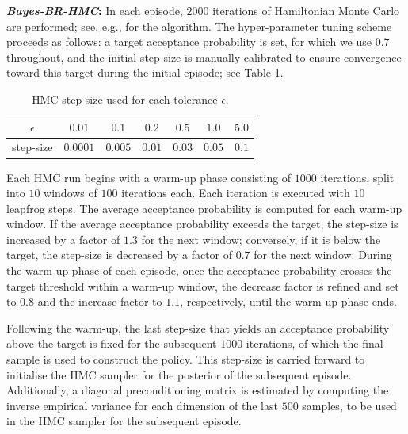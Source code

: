 \documentclass{amsart}
\begin{document}
\textbf{\textit{Bayes-BR-HMC}:} 
In each episode, $2000$ iterations of Hamiltonian Monte Carlo are performed; see, e.g., \citet{hmcneal} for the algorithm. The hyper-parameter tuning scheme proceeds as follows: a target acceptance probability is set, for which we use $0.7$ throughout, and the initial step-size is manually calibrated to ensure convergence toward this target during the initial episode; see Table \ref{tab:hmc_stepsize}.

\begin{table}[h]
    \centering
    \caption{HMC step-size used for each tolerance $\epsilon$.}
    \label{tab:hmc_stepsize}
    \begin{tabular}{|c|c|c|c|c|c|c|}
        \hline
         $\epsilon$ &  $0.01$ & $0.1$ & $0.2$ & $0.5$ & $1.0$ & $5.0$\\
        \hline
        step-size & $0.0001$ & $0.005$ & $0.01$ & $0.03$ & $0.05$ & $0.1$   \\
        \hline
    \end{tabular}
\end{table}


Each HMC run begins with a warm-up phase consisting of $1000$ iterations, split into $10$ windows of $100$ iterations each. Each iteration is executed with $10$ leapfrog steps. The average acceptance probability is computed for each warm-up window. If the average acceptance probability exceeds the target, the step-size is increased by a factor of $1.3$ for the next window; conversely, if it is below the target, the step-size is decreased by a factor of $0.7$ for the next window. During the warm-up phase of each episode, once the acceptance probability crosses the target threshold within a warm-up window, the decrease factor is refined and set to $0.8$ and the increase factor to $1.1$, respectively, until the warm-up phase ends.

Following the warm-up, the last step-size that yields an acceptance probability above the target is fixed for the subsequent $1000$ iterations, of which the final sample is used to construct the policy. This step-size is carried forward to initialise the HMC sampler for the posterior of the subsequent episode. Additionally, a diagonal preconditioning matrix is estimated by computing the inverse empirical variance for each dimension of the last $500$ samples, to be used in the HMC sampler for the subsequent episode.
\end{document}
